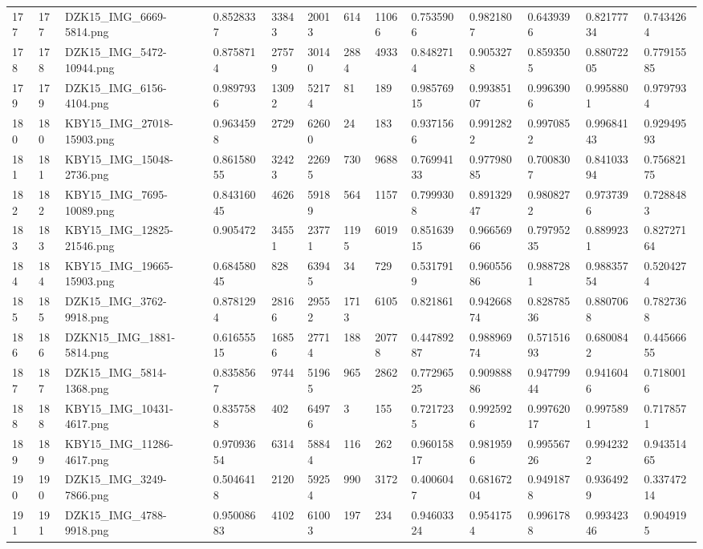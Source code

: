 \documentclass[11pt, a4paper, twoside]{report}
\begin{document}
\begin{longtable}[c]{@{}lllllllllllll@{}}
177 & 177 & DZK15\_IMG\_6669-5814.png & 0.8528337 & 33843 & 20013 & 614 & 11066 & 0.7535906 & 0.9821807 & 0.6439396 & 0.82177734 & 0.7434264 \\
178 & 178 & DZK15\_IMG\_5472-10944.png & 0.8758714 & 27579 & 30140 & 2884 & 4933 & 0.8482714 & 0.9053278 & 0.8593505 & 0.88072205 & 0.77915585 \\
179 & 179 & DZK15\_IMG\_6156-4104.png & 0.9897936 & 13092 & 52174 & 81 & 189 & 0.98576915 & 0.99385107 & 0.9963906 & 0.9958801 & 0.9797934 \\
180 & 180 & KBY15\_IMG\_27018-15903.png & 0.9634598 & 2729 & 62600 & 24 & 183 & 0.9371566 & 0.9912822 & 0.9970852 & 0.99684143 & 0.92949593 \\
181 & 181 & KBY15\_IMG\_15048-2736.png & 0.86158055 & 32423 & 22695 & 730 & 9688 & 0.76994133 & 0.97798085 & 0.7008307 & 0.84103394 & 0.75682175 \\
182 & 182 & KBY15\_IMG\_7695-10089.png & 0.84316045 & 4626 & 59189 & 564 & 1157 & 0.7999308 & 0.89132947 & 0.9808272 & 0.9737396 & 0.7288483 \\
183 & 183 & KBY15\_IMG\_12825-21546.png & 0.905472 & 34551 & 23771 & 1195 & 6019 & 0.85163915 & 0.96656966 & 0.79795235 & 0.8899231 & 0.82727164 \\
184 & 184 & KBY15\_IMG\_19665-15903.png & 0.68458045 & 828 & 63945 & 34 & 729 & 0.5317919 & 0.96055686 & 0.9887281 & 0.98835754 & 0.5204274 \\
185 & 185 & DZK15\_IMG\_3762-9918.png & 0.8781294 & 28166 & 29552 & 1713 & 6105 & 0.821861 & 0.94266874 & 0.82878536 & 0.8807068 & 0.7827368 \\
186 & 186 & DZKN15\_IMG\_1881-5814.png & 0.61655515 & 16856 & 27714 & 188 & 20778 & 0.44789287 & 0.98896974 & 0.57151693 & 0.6800842 & 0.44566655 \\
187 & 187 & DZK15\_IMG\_5814-1368.png & 0.8358567 & 9744 & 51965 & 965 & 2862 & 0.77296525 & 0.90988886 & 0.94779944 & 0.9416046 & 0.7180016 \\
188 & 188 & KBY15\_IMG\_10431-4617.png & 0.8357588 & 402 & 64976 & 3 & 155 & 0.7217235 & 0.9925926 & 0.99762017 & 0.9975891 & 0.7178571 \\
189 & 189 & KBY15\_IMG\_11286-4617.png & 0.97093654 & 6314 & 58844 & 116 & 262 & 0.96015817 & 0.9819596 & 0.99556726 & 0.9942322 & 0.94351465 \\
190 & 190 & DZK15\_IMG\_3249-7866.png & 0.5046418 & 2120 & 59254 & 990 & 3172 & 0.4006047 & 0.68167204 & 0.9491878 & 0.9364929 & 0.33747214 \\
191 & 191 & DZK15\_IMG\_4788-9918.png & 0.95008683 & 4102 & 61003 & 197 & 234 & 0.94603324 & 0.9541754 & 0.9961788 & 0.99342346 & 0.9049195 \\

\end{longtable}
\end{document}

